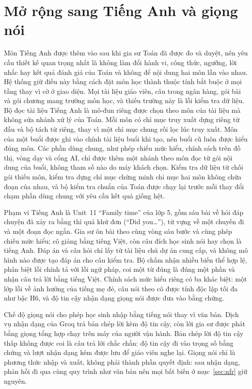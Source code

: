 \section{Mở rộng sang Tiếng Anh và giọng nói}\label{sec:english-design}
Môn Tiếng Anh được thêm vào sau khi gia sư Toán đã được đo và duyệt, nên yêu cầu thiết kế quan trọng nhất là không làm đổi hành vi, công thức, ngưỡng, lời nhắc hay kết quả đánh giá của Toán và không để nội dung hai môn lẫn vào nhau. Hệ thống giữ điều này bằng cách đặt môn học thành thuộc tính bắt buộc ở mọi tầng thay vì cờ ở giao diện. Mọi tài liệu giáo viên, câu trong ngân hàng, gói bài và gói chương mang trường môn học, và thiếu trường này là lỗi kiểm tra dữ liệu. Bộ đọc tài liệu Tiếng Anh là mô-đun riêng được chọn theo môn của tài liệu mà không sửa nhánh xử lý của Toán. Mỗi môn có chỉ mục truy xuất dựng riêng từ đầu và bộ tách từ riêng, thay vì một chỉ mục chung rồi lọc lúc truy xuất. Môn của một buổi được ghi vào chính tài liệu buổi khi tạo, nên buổi cũ luôn được hiểu đúng môn. Các phần dùng chung, như phép chiếu mức hiểu, chính sách trên đồ thị, vòng dạy và cổng AI, chỉ được thêm một nhánh theo môn đọc từ gói nội dung của buổi, không tham số nào do máy khách chọn. Kiểm tra dữ liệu từ chối gói thiếu môn, kiểm tra dựng chỉ mục chứng minh chỉ mục hai môn không chứa đoạn của nhau, và bộ kiểm tra chuẩn của Toán được chạy lại trước mỗi thay đổi chạm phần dùng chung với yêu cầu kết quả giống hệt.

Phạm vi Tiếng Anh là Unit~11 ``Family time'' của lớp 5, gồm sáu bài về hỏi đáp chuyện đã xảy ra bằng thì quá khứ đơn (``Did you\ldots''), từ vựng về một chuyến đi và một đoạn đọc ngắn. Gia sư ôn bài theo cùng vòng sáu bước và cùng phép chiếu mức hiểu; cô giảng bằng tiếng Việt, còn câu đích học sinh nói hay chọn là tiếng Anh. Đáp án và câu hỏi chỉ lấy từ tài liệu chủ dự án cung cấp, và không mô hình nào được tạo đáp án cho câu kiểm tra. Bộ chấm nhận nhiều biến thể hợp lệ, phân biệt lỗi chính tả với lỗi ngữ pháp, coi một từ đúng là đúng một phần và nhận câu trả lời bằng tiếng Việt. Chính sách mức hiểu riêng có ba khác biệt: một lớp lỗi về ảnh hưởng của tiếng mẹ đẻ, câu nói theo cô được tính độc lập tối đa như bậc H6, và độ tin cậy nhận dạng giọng nói được đưa vào bằng chứng.

Chế độ giọng nói cho phép học sinh nhập bằng tiếng nói thay vì văn bản. Dịch vụ nhận dạng của Groq trả bản chép lời kèm độ tin cậy, còn lời gia sư được phát bằng giọng tổng hợp chạy trên máy của người vận hành. Bản chép lời độ tin cậy thấp không được coi là câu trả lời chắc chắn: độ tin cậy đi vào trọng số bằng chứng và lượt nhận dạng kém được lưu để giáo viên nghe lại. Giọng nói chỉ là phương thức nhập và xuất, không phải thành phần quyết định: sau nhận dạng, phản hồi đi qua cùng quy trình như văn bản nên mọi bất biến ở mục~\ref{sec:nfr} giữ nguyên.
